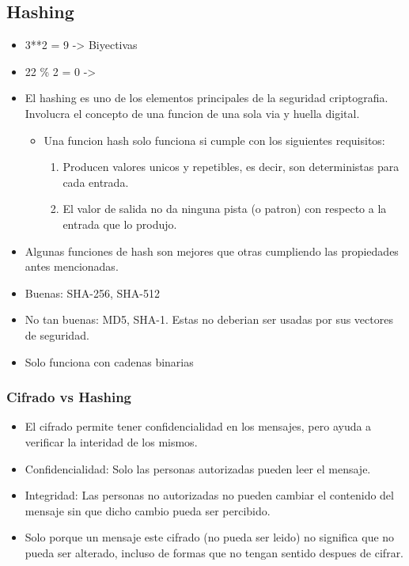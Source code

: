 \documentclass[11pt]{article}
\begin{document}
\subsection{Hashing}
\label{sec:org8c27ce7}
\begin{itemize}
\item 3**2 = 9 -> Biyectivas
\item 22 \% 2 = 0 ->

\item El hashing es uno de los elementos principales de la seguridad criptografia. Involucra el concepto de una funcion de una sola via y huella digital.
\begin{itemize}
\item Una funcion hash solo funciona si cumple con los siguientes requisitos:
\begin{enumerate}
\item Producen valores unicos y repetibles, es decir, son deterministas para cada entrada.
\item El valor de salida no da ninguna pista (o patron) con respecto a la entrada que lo produjo.
\end{enumerate}
\end{itemize}

\item Algunas funciones de hash son mejores que otras cumpliendo las propiedades antes mencionadas.
\item Buenas: SHA-256, SHA-512
\item No tan buenas: MD5, SHA-1. Estas no deberian ser usadas por sus vectores de seguridad.
\item Solo funciona con cadenas binarias
\end{itemize}
\subsubsection{Cifrado vs Hashing}
\label{sec:org18d8e95}
\begin{itemize}
\item El cifrado permite tener confidencialidad en los mensajes, pero ayuda a verificar la interidad de los mismos.
\item Confidencialidad: Solo las personas autorizadas pueden leer el mensaje.
\item Integridad: Las personas no autorizadas no pueden cambiar el contenido del mensaje sin que dicho cambio pueda ser percibido.
\item Solo porque un mensaje este cifrado (no pueda ser leido) no significa que no pueda ser alterado, incluso de formas que no tengan sentido despues de cifrar.
\end{itemize}
\end{document}

